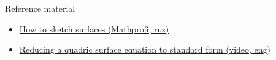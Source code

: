 \documentclass[aspectratio=169]{beamer}
\newcommand{\fbckg}[1]{\usebackgroundtemplate{\texttt{[image: \#1]}}}%
\begin{document}
\begin{frame}[t]{Reference material}
    \Large
    \begin{itemize}
        \item \href{http://www.mathprofi.ru/poverhnosti.html}{How to sketch surfaces (Mathprofi, rus)}
        \item \href{https://youtu.be/DbpieqgKKRM}{Reducing a quadric surface equation to standard form (video, eng)}
    \end{itemize}
\end{frame}

\fbckg{fibeamer/figs/last_page.png}
\frame[plain]{}
\end{document}
